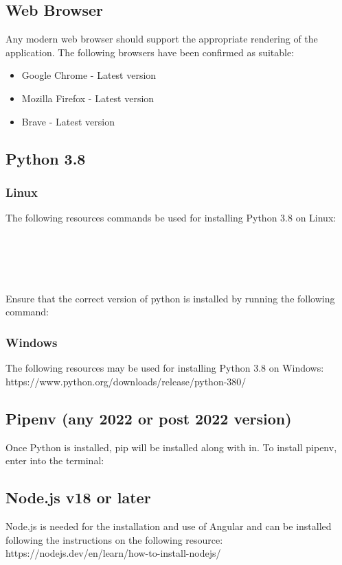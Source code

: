 \documentclass[12pt]{article}
\begin{document}
\subsection{Web Browser}
Any modern web browser should support the appropriate rendering of the application. The following browsers have been confirmed as suitable:
\begin{itemize}
    \item Google Chrome - Latest version
    \item Mozilla Firefox - Latest version
    \item Brave - Latest version
\end{itemize}

\subsection{Python 3.8}
\subsubsection{Linux}
The following resources commands be used for installing Python 3.8 on Linux:\\
\\
\\
\\
\\ \\
Ensure that the correct version of python is installed by running the following command:

\subsubsection{Windows}
The following resources may be used for installing Python 3.8 on Windows:
https://www.python.org/downloads/release/python-380/

\subsection{Pipenv (any 2022 or post 2022 version)}
Once Python is installed, pip will be installed along with in. To install pipenv, enter into the terminal:\\

\subsection{Node.js v18 or later}
Node.js is needed for the installation and use of Angular and can be installed
following the instructions on the following resource:\\
https://nodejs.dev/en/learn/how-to-install-nodejs/
\end{document}
